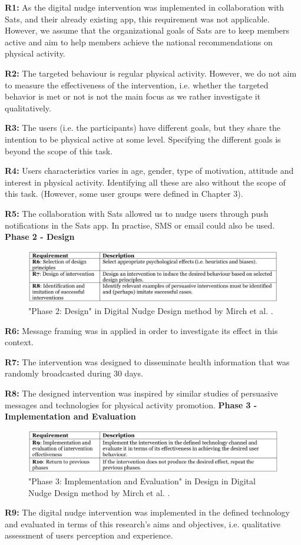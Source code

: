 \textbf{ R1:} As the digital nudge intervention was implemented in collaboration with Sats, and their already existing app, this requirement was not applicable. However, we assume that the organizational goals of Sats are to keep members active and aim to help members achieve the national recommendations on physical activity.

\textbf{R2: }The targeted behaviour is regular physical activity. However, we do not aim to measure the effectiveness of the intervention, i.e. whether the targeted behavior is met or not is not the main focus as we rather investigate it qualitatively. 

\textbf{R3:} The users (i.e. the participants)  have different goals, but they share the intention to be physical active at some level. Specifying the different goals is beyond the scope of this task.

\textbf{R4: }Users characteristics varies in age, gender, type of motivation, attitude and interest in physical activity. Identifying all these are also without the scope of this task. (However, some user groups were defined in Chapter 3).

\textbf{R5:} The collaboration with Sats allowed us to nudge users through push notifications in the Sats app. In practise, SMS or email could also be used. 
\bigbreak
\textbf{Phase 2 - Design }
\begin{figure}[h]
\includegraphics[width=1\textwidth]{images/Phase2.png}
\caption{"Phase 2: Design" in Digital Nudge Design method by Mirch et al. \cite{mirsch_making_2018}.}
\end{figure}
\bigbreak
\textbf{R6:} Message framing was in applied in order to investigate its effect in this context. 

\textbf{R7:} The intervention was designed to disseminate health information that was randomly broadcasted during 30 days. 

\textbf{R8:} The designed intervention was inspired by similar studies of persuasive messages and technologies for physical activity promotion. 
 \bigbreak
\textbf{Phase 3 - Implementation and Evaluation }
\bigbreak
\begin{figure}[ht]
\includegraphics[width=1\textwidth]{images/Phase3.png}
\caption{"Phase 3: Implementation and Evaluation" in Design in Digital Nudge Design method by Mirch et al. \cite{mirsch_making_2018}. }
\end{figure}
\bigbreak
\textbf{R9:} The digital nudge intervention was implemented in the defined technology and evaluated in terms of this research's aims and objectives, i.e. qualitative assessment of users perception and experience. 


